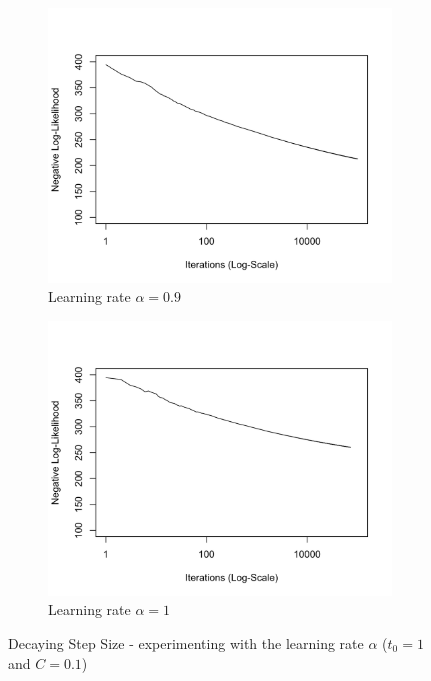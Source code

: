 \documentclass[11 pt]{article}
\begin{document}
\begin{enumerate}[label=(\Alph*)]
\begin{figure}[H]
\begin{center}
\begin{subfigure}[h]{0.45\linewidth}
			\includegraphics[width=\linewidth]{Fig/F3PD09.png}
			\caption{Learning rate $\alpha=0.9$}
		\end{subfigure}
		\begin{subfigure}[h]{0.45\linewidth}
			\includegraphics[width=\linewidth]{Fig/F3PD1.png}
			\caption{Learning rate $\alpha=1$}
		\end{subfigure}
		\caption{Decaying Step Size - experimenting with the learning rate $\alpha$ ($t_0=1$ and $C=0.1$)}
		\label{fig:Fig3}
	\end{center}
\end{figure}


\end{enumerate}


	
\end{document}
